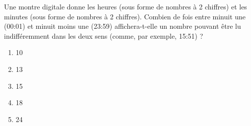 Une montre digitale donne les heures (sous forme de nombres à 2 chiffres) et les minutes (sous forme de nombres à 2 chiffres). Combien de fois entre minuit une (00:01) et minuit moins une (23:59) affichera-t-elle un nombre pouvant être lu indifféremment dans les deux sens (comme, par exemple, 15:51) ?
\begin{multicols}{5}
  \begin{enumerate}[A/]
  \item 10
  \item 13
  \item 15
  \item 18
  \item 24
  \end{enumerate}
\end{multicols}